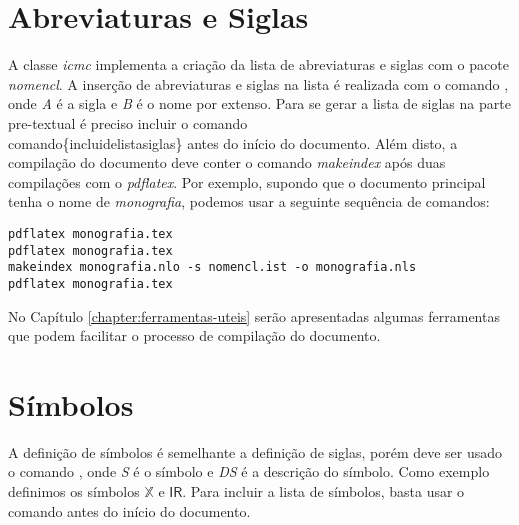 \section{Abreviaturas e Siglas}

A classe \textit{icmc} implementa a criação da lista de abreviaturas e siglas com o pacote \textit{nomencl}. A inserção de abreviaturas e siglas na lista é realizada com o comando , onde \textit{A} é a sigla e \textit{B} é o nome por extenso. Para se gerar a lista de siglas na parte pre-textual é preciso incluir o comando \\comando\{incluidelistasiglas\} antes do início do documento. Além disto, a compilação do documento deve conter o comando \textit{makeindex} após duas compilações com o \textit{pdflatex}. Por exemplo, supondo que o documento principal tenha o nome de \textit{monografia}, podemos usar a seguinte sequência de comandos:
\begin{verbatim}
pdflatex monografia.tex
pdflatex monografia.tex
makeindex monografia.nlo -s nomencl.ist -o monografia.nls
pdflatex monografia.tex
\end{verbatim}

No Capítulo \ref{chapter:ferramentas-uteis} serão apresentadas algumas ferramentas que podem facilitar o processo de compilação do documento.

\section{Símbolos}

A definição de símbolos é semelhante a definição de siglas, porém deve ser usado o comando , onde \textit{S} é o símbolo e \textit{DS} é a descrição do símbolo. Como exemplo definimos os símbolos $\mathbb{X}$ e $\mathsf{I\!R}$. Para incluir a lista de símbolos, basta usar o comando  antes do início do documento.
